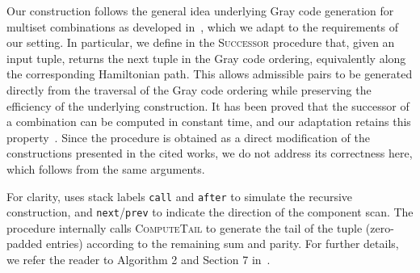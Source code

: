 \begin{algorithm}[t!]
\begin{algorithmic}[1]
    \Else{}

        \Else{}
            \EndIf{}
        \EndIf{}
    \EndIf{}

\EndWhile{}

\EndFunction{}
\end{algorithmic}
\end{algorithm}



Our construction follows the general idea underlying Gray code generation for multiset combinations as developed in~\cite{DBLP:journals/ejc/RuskeyS96,DBLP:journals/cj/Takaoka99,DBLP:journals/corr/Takaoka15a}, which we adapt to the requirements of our setting. 
In particular, we define in  the \textsc{Successor} procedure that, given an input tuple, returns the next tuple in the Gray code ordering, equivalently along the corresponding Hamiltonian path. 
This allows admissible pairs to be generated directly from the traversal of the Gray code ordering while preserving the efficiency of the underlying construction. 
It has been proved that the successor of a combination can be computed in constant time, and our adaptation retains this property~\cite{DBLP:journals/cj/Takaoka99,DBLP:journals/corr/Takaoka15a}.
Since the procedure is obtained as a direct modification of the constructions presented in the cited works, we do not address its correctness here, which follows from the same arguments.

For clarity,  uses stack labels \texttt{call} and \texttt{after} to simulate the recursive construction, and \texttt{next}/\texttt{prev} to indicate the direction of the component scan.
The procedure internally calls \textsc{ComputeTail} to generate the tail of the tuple (zero-padded entries) according to the remaining sum and parity.  
For further details, we refer the reader to Algorithm 2 and Section 7 in~\cite{DBLP:journals/corr/Takaoka15a}.
